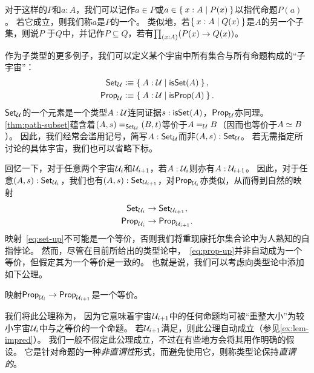 对于这样的$P$和$a:A$，我们可以记作$a\in P$或$a\in \setof{x:A | P(x)}$以指代命题$P(a)$。
若它成立，则我们称$a$是$P$的一个。
类似地，若$\setof{x:A | Q(x)}$是$A$的另一个子集，则说$P$
%
%
于$Q$中，并记作$P\subseteq Q$，若有$\prd{x:A}(P(x)\rightarrow Q(x))$。

作为子类型的更多例子，我们可以定义某个宇宙\UU{}中所有集合与所有命题构成的“子宇宙”：
\begin{align*}
  \setU &\defeq \setof{A:\UU | \isset(A) },\\
  \propU &\defeq \setof{A:\UU | \isprop(A) }.
\end{align*}
$\setU$的一个元素是一个类型$A:\UU$连同证据$s:\isset(A)$，$\propU$亦同理。
\cref{thm:path-subset}蕴含着$\id[\setU]{(A,s)}{(B,t)}$等价于$\id[\UU]AB$（因而也等价于$\eqv AB$）。
因此，我们经常会滥用记号，简写$A:\setU$而非$(A,s):\setU$。
若无需指定所讨论的具体宇宙，我们也可以省略下标\UU。

回忆一下，对于任意两个宇宙$\UU_i$和$\UU_{i+1}$，若$A:\UU_i$则亦有$A:\UU_{i+1}$。
因此，对于任意$(A,s):\set_{\UU_i}$，我们也有$(A,s):\set_{\UU_{i+1}}$，对$\prop_{\UU_i}$亦类似，从而得到自然的映射
\begin{align}
  \set_{\UU_i} &\to \set_{\UU_{i+1}}\label{eq:set-up},\\
  \prop_{\UU_i} &\to \prop_{\UU_{i+1}}.\label{eq:prop-up}
\end{align}
映射~\eqref{eq:set-up}不可能是一个等价，否则我们将重现康托尔集合论中为人熟知的自指悖论。
然而，尽管在目前所给出的类型论中，~\eqref{eq:prop-up}并非自动成为一个等价，但假定其为一个等价是一致的。
也就是说，我们可以考虑向类型论中添加如下公理。

\begin{axiom}[命题大小重整]
  映射$\prop_{\UU_i} \to \prop_{\UU_{i+1}}$是一个等价。
\end{axiom}

我们将此公理称为，
因为它意味着宇宙$\UU_{i+1}$中的任何命题均可被“重整大小”为较小宇宙$\UU_i$中与之等价的一个命题。
若$\UU_{i+1}$满足\LEM{}，则此公理自动成立（参见\cref{ex:lem-impred}）。
我们一般不假定此公理成立，不过在有些地方会将其用作明确的假设。
它是针对命题的一种\emph{非直谓性}形式，而避免使用它，则称类型论保持\emph{直谓的}。
%
%

